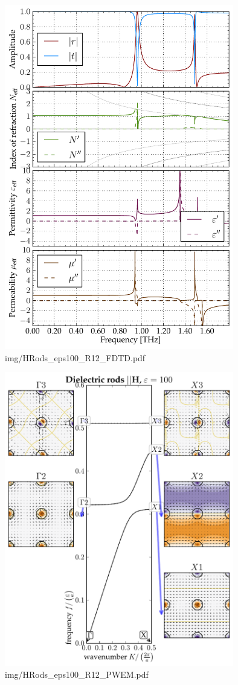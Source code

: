 \begin{figure} \caption{img/HRods\_eps100\_R12\_FDTD.pdf}  \centering \includegraphics[width=10cm]{img/HRods_eps100_R12_FDTD.pdf} \end{figure} \clearpage
\begin{figure} \caption{img/HRods\_eps100\_R12\_PWEM.pdf}  \centering \includegraphics[width=10cm]{img/HRods_eps100_R12_PWEM.pdf} \end{figure} \clearpage
